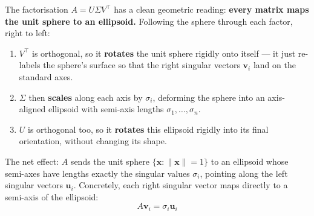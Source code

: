 \documentclass[12pt, a4paper]{article}
\theoremstyle{definition}
\begin{document}
The factorisation $A = U\Sigma V^\top$ has a clean geometric reading: \textbf{every matrix maps the unit sphere to an ellipsoid.} Following the sphere through each factor, right to left:

\begin{enumerate}
    \item $V^\top$ is orthogonal, so it \textbf{rotates} the unit sphere rigidly onto itself — it just re-labels the sphere's surface so that the right singular vectors $\mathbf{v}_i$ land on the standard axes.
    \item $\Sigma$ then \textbf{scales} along each axis by $\sigma_i$, deforming the sphere into an axis-aligned ellipsoid with semi-axis lengths $\sigma_1, \ldots, \sigma_n$.
    \item $U$ is orthogonal too, so it \textbf{rotates} this ellipsoid rigidly into its final orientation, without changing its shape.
\end{enumerate}

The net effect: $A$ sends the unit sphere $\{\mathbf{x} : \|\mathbf{x}\| = 1\}$ to an ellipsoid whose semi-axes have lengths exactly the singular values $\sigma_i$, pointing along the left singular vectors $\mathbf{u}_i$. Concretely, each right singular vector maps directly to a semi-axis of the ellipsoid:
\[
    A\mathbf{v}_i = \sigma_i \mathbf{u}_i
\]

\begin{center}
\end{center}
\end{document}
